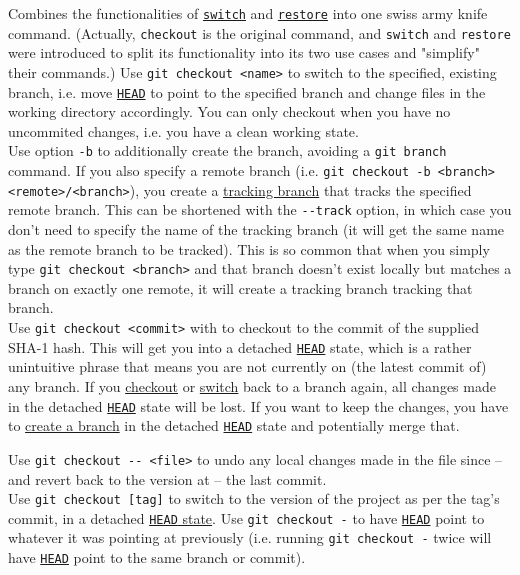 \documentclass[8pt, table, xcdraw]{article}%
\begin{document}
Combines the functionalities of \hyperref[switch]{\lstinline{switch}} and \hyperref[restore]{\lstinline{restore}} into one swiss army knife command. (Actually, \lstinline{checkout} is the original command, and \lstinline{switch} and \lstinline{restore} were introduced to split its functionality into its two use cases and "simplify" their commands.)
Use \lstinline{git checkout <name>} to switch to the specified, existing branch, i.e. move \hyperref[branching]{\lstinline{HEAD}} to point to the specified branch and change files in the working directory accordingly. You can only checkout when you have no uncommited changes, i.e. you have a clean working state.\\
Use option \lstinline{-b} to additionally create the branch, avoiding a \lstinline{git branch} command. If you also specify a remote branch (i.e. \lstinline{git checkout -b <branch> <remote>/<branch>}), you create a \hyperref[remotes]{tracking branch} that tracks the specified remote branch. This can be shortened with the \lstinline{--track} option, in which case you don't need to specify the name of the tracking branch (it will get the same name as the remote branch to be tracked). This is so common that when you simply type \lstinline{git checkout <branch>} and that branch doesn't exist locally but matches a branch on exactly one remote, it will create a tracking branch tracking that branch.\\
Use \lstinline{git checkout <commit>} with to checkout to the commit of the supplied SHA-1 hash. This will get you into a detached \hyperref[branching]{\lstinline{HEAD}} state, which is a rather unintuitive phrase that means you are not currently on (the latest commit of) any branch. If you \hyperref[checkout]{checkout} or \hyperref[switch]{switch} back to a branch again, all changes made in the detached \hyperref[branching]{\lstinline{HEAD}} state will be lost. If you want to keep the changes, you have to \hyperref[branch]{create a branch} in the detached \hyperref[branching]{\lstinline{HEAD}} state and potentially merge that.

Use \lstinline{git checkout -- <file>} to undo any local changes made in the file since -- and revert back to the version at -- the last commit.\\
Use \lstinline{git checkout [tag]} to switch to the version of the project as per the tag's commit, in a detached \hyperref[branching]{\lstinline{HEAD} state}.
Use \lstinline{git checkout -} to have \hyperref[branching]{\lstinline{HEAD}} point to whatever it was pointing at previously (i.e. running \lstinline{git checkout -} twice will have \hyperref[branching]{\lstinline{HEAD}} point to the same branch or commit).
\end{document}
